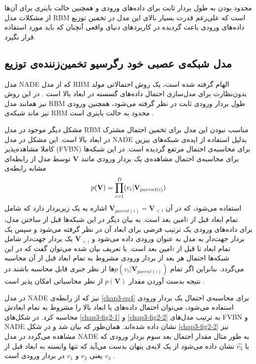 محدود بودن به طول بردار ثابت برای داده‌های ورودی و همچنین حالت باینری برای آن‌ها از مشکلات مدل
RBM
است که علی‌رغم قدرت بسیار بالای این مدل در تخمین توزیع داده‌های ورودی باعث گردیده در کاربردهای دنیای واقعی‌ آنچنان که باید مورد استفاده قرار نگیرد.
	
	\subsection{مدل شبکه‌‌ی عصبی خود رگرسیو تخمین‌زننده‌ی توزیع }
	\label{chap3sec2sub2}
	مدل
	NADE
	که از مدل
	RBM
	الهام گرفته شده است، یک روش احتمالاتی مولد بدون‌نظارت برای مدل‌سازی احتمال داده‌های گسسته در ابعاد بالا است
	\cite{larochelle2011neural}.
	 در این روش نیز همانند مدل
	RBM
	طول بردار ورودی ثابت در نظر گرفته می‌‌شود، همچنین ورودی نیز ماند شبکه‌ی
	RBM
	محدود به حالت باینری است
	\cite{larochelle2011neural}.
	
	 مشکل دیگر موجود در مدل
	RBM
	 مناسب نبودن این مدل برای تخمین احتمال مشترک در ابعاد بالا است. این مشکل در مدل
	NADE 
	بدلیل استفاده از ایده‌ی شبکه‌های بیزین کاملا مشاهده‌پذیر
		(FVBN)
	\cite{dayan1996does}\cite{bengio1999modeling}
	برای محاسبه‌ی احتمال مرتفع گردیده است. در این شبکه‌ها برای محاسبه‌ی احتمال مشاهده‌ی یک بردار ورودی مانند
	$\textbf{V}$
	توسط مدل از رابطه‌ای مشابه رابطه‌ی
	\begin{align}
		\centering
		\label{chap3-eq4}
		p(\textbf{V}) = \prod_{i=1}^{D}(v_i|\textbf{V}_{parent(i)})
	\end{align}
	استفاده می‌‌شود، که در آن
	$\textbf{V}_{parent(i)} = \textbf{V}_{<i}$
	اشاره به یک زیربردار دارد که شامل تمام ابعاد قبل از
	$i$امین 
بعد است. به بیان دیگر در این شبکه‌ها قبل از ساختن مدل، برای داده‌های ورودی یک ترتیب فرضی‌ برای ابعاد آن در نظر گرفته می‌‌شود و سپس یک بردار جهت‌دار به مدل به عنوان ورودی داده می‌‌شود و
	$\textbf{V}_{<i}$
	 یک بردار جهت‌دار شامل تمام ابعاد تا قبل از
	$i$امین 
	بعد است. با تعریف بیان شده می‌‌توان گفت که در این شبکه‌ها احتمال هر بعد از بردار ورودی مشروط به تمام ابعاد قبل از آن محاسبه می‌گردد. بنابراین اگر تمام
	$p(v_i|\textbf{V}_{parent(i)})$ها
	از نظر جبری قابل محاسبه باشند در نتیجه بدست آوردن مقدار
	$p(\textbf{V})$
	از نظر محاسباتی امکان پذیر است
	\cite{larochelle2011neural}.
	
	در مدل
	NADE
	نیز که از رابطه‌ی
	\ref{chap3-eq4}
	برای محاسبه‌ی احتمال یک بردار ورودی استفاده می‌شود، می‌‌توان احتمال داده‌های با ابعاد بالا را مشروط به تمام ابعادش محاسبه کرد. در شکل‌های
	\ref{chap3-fig2-1}
	و
	\ref{chap3-fig2-2}
	به ترتیب مدل‌های
	FVBN
	و
	NADE
	نشان داده شده‌اند. همان‌طور که بیان شد و در شکل
	\ref{chap3-fig2-2}
	نیز مشاهده می‌‌گردد در مدل
	NADE
	به طور مثال مقدار احتمال بعد سوم بردار ورودی که با
	$\hat{v_3}$
	نشان داده می‌‌شود از یک لایه‌ی پنهان بدست می‌‌آید که تنها وابسته به ابعاد قبل از
	$v_3$
	یعنی‌
	$v_2$
	و
	$v_1$
	در بردار ورودی است
	\cite{larochelle2011neural}.

